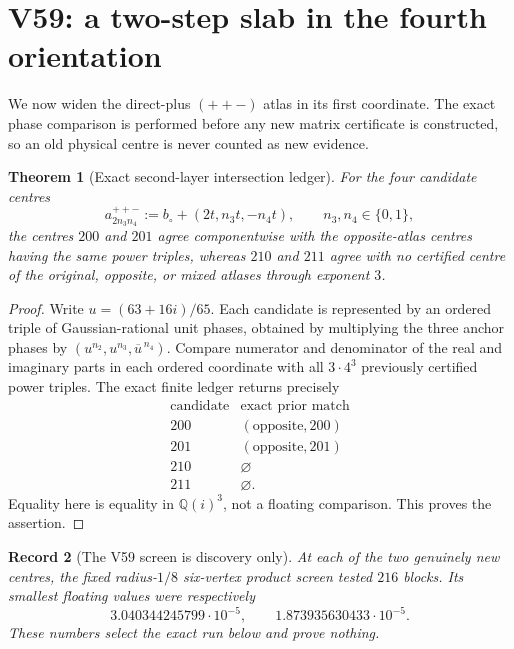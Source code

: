 \documentclass[11pt,oneside]{article}
\newtheorem{theorem}{Theorem}[section]
\newtheorem{record}[theorem]{Record}
\theoremstyle{definition}
\theoremstyle{remark}
\begin{document}
\section{V59: a two-step slab in the fourth orientation}
\label{sec:newv59-fourth-two-step}

We now widen the direct-plus \((++-)\) atlas in its first
coordinate.  The exact phase comparison is performed before any
new matrix certificate is constructed, so an old physical centre
is never counted as new evidence.

\begin{theorem}[Exact second-layer intersection ledger]
\label{thm:newv59-intersections}
For the four candidate centres
\[
 a_{2n_3n_4}^{++-}
 :=b_\circ+(2t,n_3t,-n_4t),
 \qquad n_3,n_4\in\{0,1\},                            \tag{59.1}
\]
the centres \(200\) and \(201\) agree componentwise with the
opposite-atlas centres having the same power triples, whereas
\(210\) and \(211\) agree with no certified centre of the original,
opposite, or mixed atlases through exponent \(3\).
\end{theorem}

\begin{proof}
Write \(u=(63+16i)/65\).  Each candidate is represented by an
ordered triple of Gaussian-rational unit phases, obtained by
multiplying the three anchor phases by
\((u^{n_2},u^{n_3},\overline u^{\,n_4})\).  Compare numerator and
denominator of the real and imaginary parts in each ordered
coordinate with all \(3\cdot4^3\) previously certified power
triples.  The exact finite ledger returns precisely
\[
\begin{array}{c|c}
\text{candidate}&\text{exact prior match}\\ \hline
200&(\text{opposite},200)\\
201&(\text{opposite},201)\\
210&\varnothing\\
211&\varnothing .
\end{array}
\]
Equality here is equality in \(\mathbb Q(i)^3\), not a floating
comparison.  This proves the assertion.
\end{proof}

\begin{record}[The V59 screen is discovery only]
\label{rec:newv59-screen}
At each of the two genuinely new centres, the fixed radius-\(1/8\)
six-vertex product screen tested \(216\) blocks.  Its smallest
floating values were respectively
\[
 3.040344245799\cdot10^{-5},
 \qquad
 1.873935630433\cdot10^{-5}.                          \tag{59.2}
\]
These numbers select the exact run below and prove nothing.
\end{record}
\end{document}

